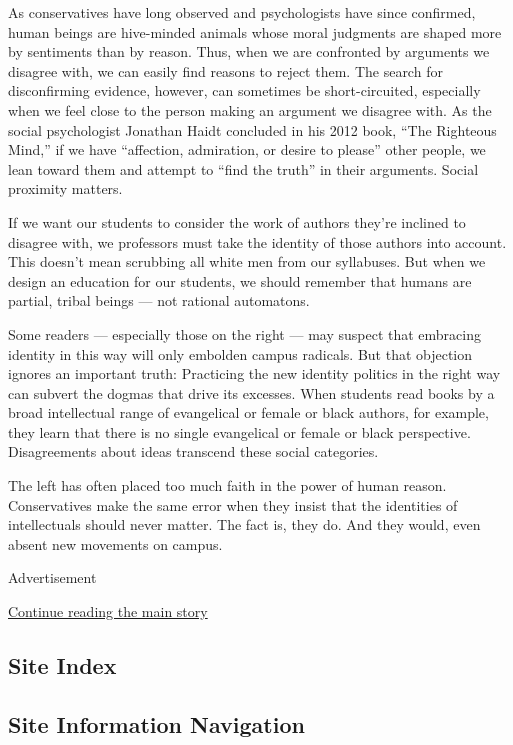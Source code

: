 As conservatives have long observed and psychologists have since
confirmed, human beings are hive-minded animals whose moral judgments
are shaped more by sentiments than by reason. Thus, when we are
confronted by arguments we disagree with, we can easily find reasons to
reject them. The search for disconfirming evidence, however, can
sometimes be short-circuited, especially when we feel close to the
person making an argument we disagree with. As the social psychologist
Jonathan Haidt concluded in his 2012 book, ``The Righteous Mind,'' if we
have ``affection, admiration, or desire to please'' other people, we
lean toward them and attempt to ``find the truth'' in their arguments.
Social proximity matters.

If we want our students to consider the work of authors they're inclined
to disagree with, we professors must take the identity of those authors
into account. This doesn't mean scrubbing all white men from our
syllabuses. But when we design an education for our students, we should
remember that humans are partial, tribal beings --- not rational
automatons.

Some readers --- especially those on the right --- may suspect that
embracing identity in this way will only embolden campus radicals. But
that objection ignores an important truth: Practicing the new identity
politics in the right way can subvert the dogmas that drive its
excesses. When students read books by a broad intellectual range of
evangelical or female or black authors, for example, they learn that
there is no single evangelical or female or black perspective.
Disagreements about ideas transcend these social categories.

The left has often placed too much faith in the power of human reason.
Conservatives make the same error when they insist that the identities
of intellectuals should never matter. The fact is, they do. And they
would, even absent new movements on campus.

Advertisement

\protect\hyperlink{after-bottom}{Continue reading the main story}

\hypertarget{site-index}{%
\subsection{Site Index}\label{site-index}}

\hypertarget{site-information-navigation}{%
\subsection{Site Information
Navigation}\label{site-information-navigation}}

